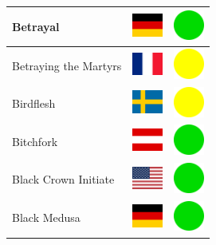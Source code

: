 \documentclass[12pt, a4paper, twoside]{report}
\begin{document}
\begin{center}
\begin{longtable}{|p{5cm}|p{2cm}|p{2cm}|}
Betrayal & \includegraphics[width=1cm]{4x3/de} & \includegraphics[width=1cm]{likes/y} \\ \hline
Betraying the Martyrs & \includegraphics[width=1cm]{4x3/fr} & \includegraphics[width=1cm]{likes/m} \\ \hline
Birdflesh & \includegraphics[width=1cm]{4x3/se} & \includegraphics[width=1cm]{likes/m} \\ \hline
Bitchfork & \includegraphics[width=1cm]{4x3/at} & \includegraphics[width=1cm]{likes/y} \\ \hline
Black Crown Initiate & \includegraphics[width=1cm]{4x3/us} & \includegraphics[width=1cm]{likes/y} \\ \hline
Black Medusa & \includegraphics[width=1cm]{4x3/de} & \includegraphics[width=1cm]{likes/y} \\ \hline

\end{longtable}
\end{center}
\end{document}
